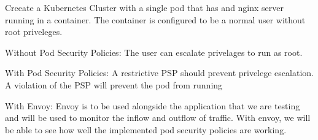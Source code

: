 Creeate a Kubernetes Cluster with a single pod that has and nginx server
running in a container. The container is configured to be a normal user
without root priveleges.

Without Pod Security Policies:
The user can escalate privelages to run as root.

With Pod Security Policies:
A restrictive PSP should prevent privelege escalation.
A violation of the PSP will prevent the pod from running

With Envoy:
Envoy is to be used alongside the application that we are testing and
will be used to monitor the inflow and outflow of traffic. With envoy,
we will be able to see how well the implemented pod security policies
are working.
